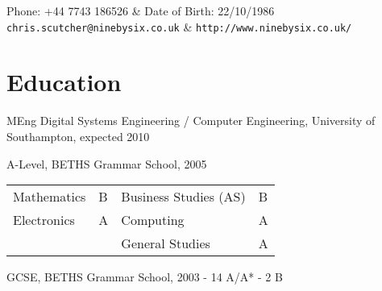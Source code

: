 \documentclass[overlapped,line,letterpaper]{res}
\begin{document}

\setlength{\leftmargini}{0em}
\setlength{\leftmargin}{1.5cm}
\setlength{\rightmargin}{1.5cm}
\setlength{\textheight}{800pt}
\setlength{\voffset}{-0.5in}
\renewcommand{\labelitemi}{}

\renewcommand{\namefont}{\large\textbf}



\begin{resume}

\begin{ncolumn}{2}  
  Phone: +44 7743 186526                & Date of Birth: 22/10/1986 \\		        
  {\tt chris.scutcher@ninebysix.co.uk}  & {\tt \verb+http://www.ninebysix.co.uk/+} 
\end{ncolumn}


\section{\bf Education}
MEng Digital Systems Engineering / Computer Engineering, University of 
Southampton, expected 2010

A-Level, BETHS Grammar School, 2005						\\ 
\hspace*{1cm} 
\begin{tabulary}{\textwidth}{p{4cm}p{0.5cm}p{4cm}p{0.5cm}}					   
Mathematics	&	B	&	Business Studies (AS)	&	B	\\ 
Electronics	&	A	&	Computing		&	A	\\ 
		&		&	General Studies		&	A	\\ 
\end{tabulary}

GCSE, BETHS Grammar School, 2003	- 14 A/A* - 2  B




\end{resume}
\end{document}
